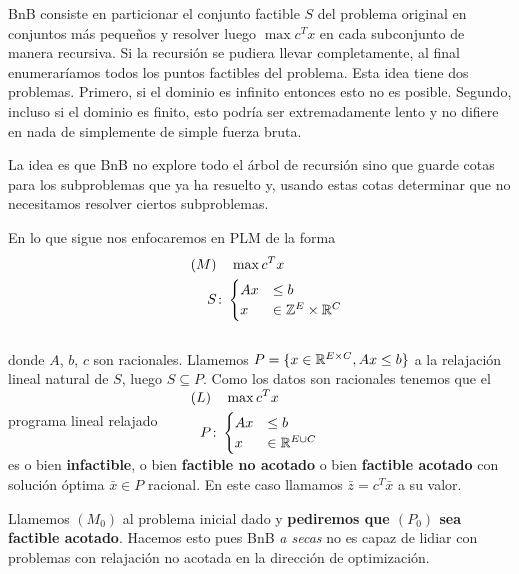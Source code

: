     BnB consiste en particionar el conjunto factible $S$ del problema original en conjuntos más pequeños y resolver luego $\max c^Tx$ en cada subconjunto de manera recursiva. Si la recursión se pudiera llevar completamente, al final  enumeraríamos todos los puntos factibles del problema. Esta idea tiene dos problemas. Primero, si el dominio es infinito entonces esto no es posible. Segundo, incluso si el dominio es finito, esto podría ser extremadamente lento y no difiere en nada de simplemente de simple fuerza bruta. 

    La idea es que BnB no explore todo el árbol de recursión sino que guarde cotas para los subproblemas que ya ha resuelto y, usando estas cotas determinar que no necesitamos resolver ciertos subproblemas. 
    
    En lo que sigue nos enfocaremos en PLM de la forma    
$$\begin{aligned}
    \qquad (M)&\quad \max c^Tx\\
    S&\colon \begin{cases}
    Ax &\leq b\\
    x&\in \mathbb Z^E\times \mathbb R^C
    \end{cases}\quad
    \end{aligned}$$\\[5pt]
    donde $A$, $b$, $c$ son racionales. Llamemos $P=\{x\in \mathbb R^{E\times C}, Ax\leq b\}$ a la relajación lineal natural de $S$, luego $S \subseteq P.$  Como los datos son racionales tenemos que el programa lineal relajado 
    $\begin{aligned}
        \qquad (L)&\quad \max c^Tx\\
        P&\colon \begin{cases}
        Ax &\leq b\\
        x&\in \mathbb R^{E\cup C}
        \end{cases}\quad
        \end{aligned}$\\[5pt]
        
    es o bien \textbf{infactible}, o bien \textbf{factible no acotado} o bien \textbf{factible acotado} con solución óptima $\bar{x}\in P$ racional. En este caso llamamos $\bar{z}=c^T\bar{x}$ a su valor.
    
    Llamemos $(M_0)$ al problema inicial dado y \textbf{pediremos que $(P_0)$ sea factible acotado}. Hacemos esto pues  BnB \emph{a secas} no es capaz de lidiar con problemas con relajación no acotada en la dirección de optimización.
    
